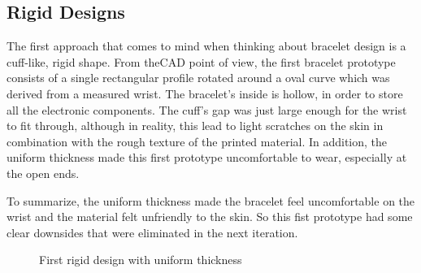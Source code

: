 \subsection{Rigid Designs}

The first approach that comes to mind when thinking about bracelet design is a cuff-like, rigid shape. From the\ac{CAD} point of view, the first bracelet prototype consists of a single rectangular profile rotated around a oval curve which was derived from a measured wrist. The bracelet's inside is hollow, in order to store all the electronic components. The cuff's gap was just large enough for the wrist to fit through, although in reality, this lead to light scratches on the skin in combination with the rough texture of the printed material. In addition, the uniform thickness made this first prototype uncomfortable to wear, especially at the open ends. 

To summarize, the uniform thickness made the bracelet feel uncomfortable on the wrist and the material felt unfriendly to the skin. So this fist prototype had some clear downsides that were eliminated in the next iteration.

\begin{figure}[bth]
	\myfloatalign
	 \quad
	\caption{First rigid design with uniform thickness}
\end{figure}

